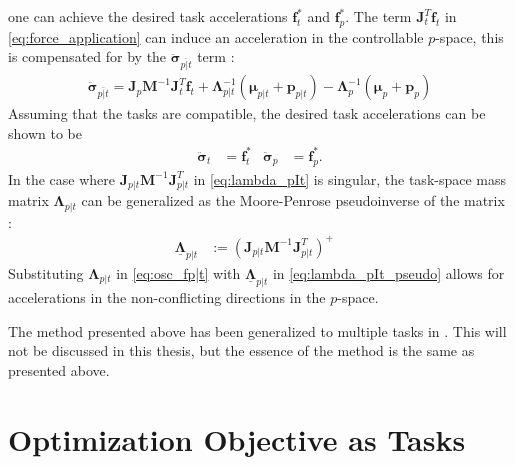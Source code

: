 one can achieve the desired task accelerations $\bm{f}_t^*$ and
$\bm{f}_p^*$. The term $\bm{J}_t^T\bm{f}_t$ in \autoref{eq:force_application} can induce an acceleration in the 
controllable $p$-space, this is compensated for by the
$\ddot{\bm{\sigma}}_{\overline{p|t}}$ term \cite{sentis2004}:
\begin{align}
    \ddot{\bm{\sigma}}_{\overline{p|t}} = \bm{J}_p \bm{M}^{-1} \bm{J}_t^T \bm{f}_t
    + \bm{\Lambda}_{p|t}^{-1}\left(\bm{\mu}_{p|t} + \bm{p}_{p|t}\right)
    - \bm{\Lambda}_{p}^{-1}\left(\bm{\mu}_p + \bm{p}_p\right)
\end{align}
Assuming that the tasks are compatible, the desired task accelerations can be
shown to be
\begin{align}
    \ddot{\bm{\sigma}}_t &= \bm{f}_t^* & \ddot{\bm{\sigma}}_p &= \bm{f}_p^*.
\end{align}
In the case where $\bm{J}_{p|t}\bm{M}^{-1}\bm{J}_{p|t}^T$ in \autoref{eq:lambda_pIt}
is singular, the task-space mass matrix $\bm{\Lambda}_{p|t}$ can be generalized
as the Moore-Penrose pseudoinverse of the matrix \cite{khatib2004}:
\begin{align}
    \underline{\bm{\Lambda}}_{p|t} &:= \left(\bm{J}_{p|t} \bm{M}^{-1} \bm{J}_{p|t}^T\right)^{+} &
    \label{eq:lambda_pIt_pseudo}
\end{align}
Substituting $\bm{\Lambda}_{p|t}$ in \autoref{eq:osc_fp|t} with
$\underline{\bm{\Lambda}}_{p|t}$ in \autoref{eq:lambda_pIt_pseudo} allows for
accelerations in the non-conflicting directions in the $p$-space.

The method presented above has been generalized to multiple tasks in \cite{sentis2004}.
This will not be discussed in this thesis, but the essence of the method is the same
as presented above.

\section{Optimization Objective as Tasks}

